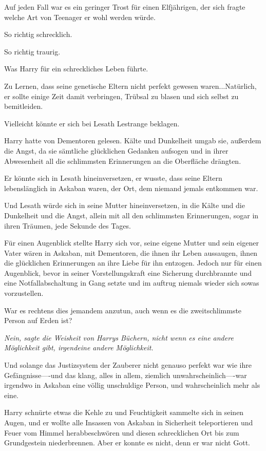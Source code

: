 {Auf jeden Fall war es ein geringer Trost für einen Elfjährigen, der sich fragte welche Art von Teenager er wohl werden würde.

So richtig schrecklich.

So richtig traurig.

Was Harry für ein schreckliches Leben führte.

Zu Lernen, dass seine genetische Eltern nicht perfekt gewesen waren...Natürlich, er sollte einige Zeit damit verbringen, Trübsal zu blasen und sich selbst zu bemitleiden.

Vielleicht könnte er sich bei Lesath Lestrange beklagen.

Harry hatte von Dementoren gelesen. Kälte und Dunkelheit umgab sie, außerdem die Angst, da sie sämtliche glücklichen Gedanken aufsogen und in ihrer Abwesenheit all die schlimmsten Erinnerungen an die Oberfläche drängten.

Er könnte sich in Lesath hineinversetzen, er wusste, dass seine Eltern lebenslänglich in Askaban waren, der Ort, dem niemand jemals entkommen war.

Und Lesath würde sich in seine Mutter hineinversetzen, in die Kälte und die Dunkelheit und die Angst, allein mit all den schlimmsten Erinnerungen, sogar in ihren Träumen, jede Sekunde des Tages.

Für einen Augenblick stellte Harry sich vor, seine eigene Mutter und sein eigener Vater wären in Askaban, mit Dementoren, die ihnen ihr Leben aussaugen, ihnen die glücklichen Erinnerungen an ihre Liebe für ihn entzogen. Jedoch nur für einen Augenblick, bevor in seiner Vorstellungskraft eine Sicherung durchbrannte und eine Notfallabschaltung in Gang setzte und im auftrug niemals wieder sich sowas vorzustellen.

War es rechtens dies jemandem anzutun, auch wenn es die zweitschlimmste Person auf Erden ist?

\emph{Nein, sagte die Weisheit von Harrys Büchern, nicht wenn es eine andere Möglichkeit gibt, irgendeine andere Möglichkeit.}

Und solange das Justizsystem der Zauberer nicht genauso perfekt war wie ihre Gefängnisse----und das klang, alles in allem, ziemlich unwahrscheinlich----war irgendwo in Askaban eine völlig unschuldige Person, und wahrscheinlich mehr als eine.

Harry schnürte etwas die Kehle zu und Feuchtigkeit sammelte sich in seinen Augen, und er wollte alle Insassen von Askaban in Sicherheit teleportieren und Feuer vom Himmel herabbeschwören und diesen schrecklichen Ort bis zum Grundgestein niederbrennen. Aber er konnte es nicht, denn er war nicht Gott.

}

